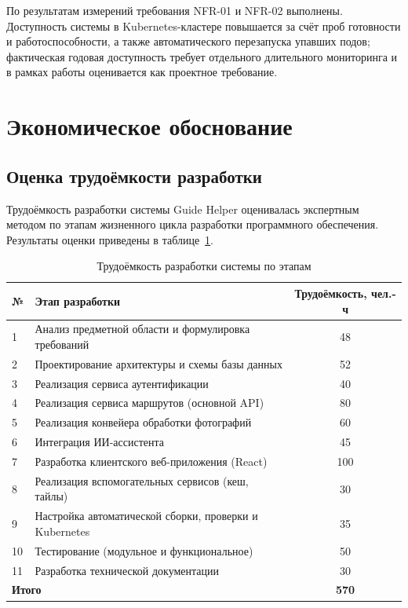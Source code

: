 По результатам измерений требования NFR-01 и NFR-02 выполнены. Доступность
системы в Kubernetes-кластере повышается за счёт проб готовности и
работоспособности, а также автоматического перезапуска упавших подов; фактическая годовая доступность
требует отдельного длительного мониторинга и в рамках работы оценивается как
проектное требование.

\section{Экономическое обоснование}

\subsection{Оценка трудоёмкости разработки}

Трудоёмкость разработки системы Guide Helper оценивалась экспертным методом по
этапам жизненного цикла разработки программного обеспечения. Результаты оценки
приведены в таблице~\ref{tab:labor}.

\begin{table}[H]
\caption{Трудоёмкость разработки системы по этапам}
\label{tab:labor}
\begin{tabularx}{\textwidth}{|l|X|c|}
\hline
\textbf{№} & \textbf{Этап разработки} & \textbf{Трудоёмкость, чел.-ч} \\
\hline
1 & Анализ предметной области и формулировка требований & 48 \\
\hline
2 & Проектирование архитектуры и схемы базы данных & 52 \\
\hline
3 & Реализация сервиса аутентификации & 40 \\
\hline
4 & Реализация сервиса маршрутов (основной API) & 80 \\
\hline
5 & Реализация конвейера обработки фотографий & 60 \\
\hline
6 & Интеграция ИИ-ассистента & 45 \\
\hline
7 & Разработка клиентского веб-приложения (React) & 100 \\
\hline
8 & Реализация вспомогательных сервисов (кеш, тайлы) & 30 \\
\hline
9 & Настройка автоматической сборки, проверки и Kubernetes & 35 \\
\hline
10 & Тестирование (модульное и функциональное) & 50 \\
\hline
11 & Разработка технической документации & 30 \\
\hline
\multicolumn{2}{|l|}{\textbf{Итого}} & \textbf{570} \\
\hline
\end{tabularx}
\end{table}

